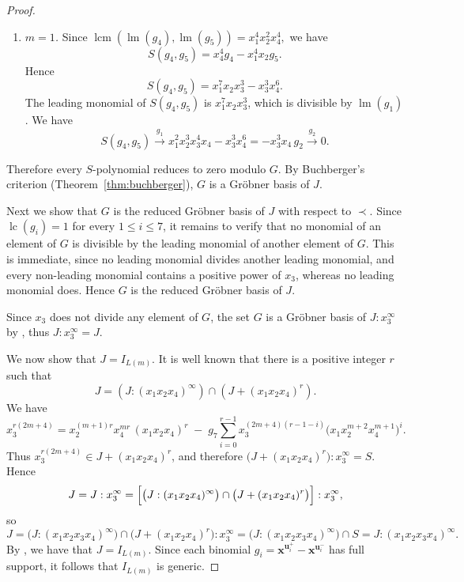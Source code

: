 \documentclass[12pt,a4paper]{amsart}
\theoremstyle{definition}
\begin{document}
\begin{proof}
\begin{enumerate}
\begin{enumerate}
\item[\textup{(b)}] \emph{$m=1$.} Since
$
\operatorname{lcm}\!\left(\operatorname{lm}(g_4),\operatorname{lm}(g_5)\right)
=
x_1^4x_2^2x_4^4,$
we have
\[
S(g_4,g_5)
=
x_4^4g_4
-
x_1^4x_2g_5.
\]
Hence
\[
S(g_4,g_5)
=
x_1^7x_2x_3^3
-
x_3^3x_4^6.
\]
The leading monomial of $S(g_4,g_5)$ is
$x_1^7x_2x_3^3$, which is divisible by
$\operatorname{lm}(g_1)$. We have
\[S(g_4,g_5)
\stackrel{g_1}{\longrightarrow}
x_1^2x_2^3x_3^4x_4
-
x_3^3x_4^6=
-x_3^3x_4\,g_2
\stackrel{g_2}{\longrightarrow}
0.
\]

\end{enumerate}

\end{enumerate}
Therefore every $S$-polynomial reduces to zero modulo $G$. By
Buchberger's criterion (Theorem~\ref{thm:buchberger}), $G$ is a
Gr\"obner basis of $J$.

Next we show that $G$ is the reduced Gr\"obner basis of $J$ with respect to $\prec$. Since $\operatorname{lc}(g_i)=1$ for every $1\le i\le7$, it remains to
verify that no monomial of an element of $G$ is divisible by the
leading monomial of another element of $G$. This is immediate, since
no leading monomial divides another leading monomial, and every
non-leading monomial contains a positive power of $x_3$, whereas no
leading monomial does. Hence $G$ is the reduced Gr\"obner basis of
$J$. 

Since $x_3$ does not divide any element of $G$, the set $G$ is a Gr\"obner basis of
$J:x_3^{\infty}$ by \cite[Lemma 12.1]{Stu}, thus $J:x_3^{\infty}=J$.

We now show that $J=I_{L(m)}$. It is well known that there is a positive integer $r$ such that $$J=(J:(x_1x_2x_4)^\infty) \cap (J+(x_1x_2x_4)^r).$$ We have \[
x_3^{r(2m+4)}
=
x_2^{(m+1)r}x_4^{mr}\,(x_1x_2x_4)^r
\;-\;
g_7\sum_{i=0}^{r-1}x_3^{(2m+4)(r-1-i)}\bigl(x_1x_2^{m+2}x_4^{m+1}\bigr)^i.
\] Thus $x_3^{r(2m+4)}\in J+(x_1x_2x_4)^r$, and therefore
$\bigl(J+(x_1x_2x_4)^r\bigr):x_3^\infty=S$. Hence
\[
J
=
J:x_3^\infty
=
\Bigl[\bigl(J:(x_1x_2x_4)^\infty\bigr)
\cap
\bigl(J+(x_1x_2x_4)^r\bigr)\Bigr]:x_3^\infty,
\] so \[
J
=
\bigl(J:(x_1x_2x_3x_4)^\infty\bigr)\cap \bigl(J+(x_1x_2x_4)^r\bigr):x_3^\infty
=\bigl(J:(x_1x_2x_3x_4)^\infty\bigr)\cap S=
J:(x_1x_2x_3x_4)^\infty.
\] By \cite[Corollary 2.5]{ES}, we have that $J=I_{L(m)}$. Since each binomial $g_i=\mathbf{x}^{\mathbf{u}_i^+}-\mathbf{x}^{\mathbf{u}_i^-}$
has full support, it follows that $I_{L(m)}$ is generic.


\end{proof}
\end{document}
